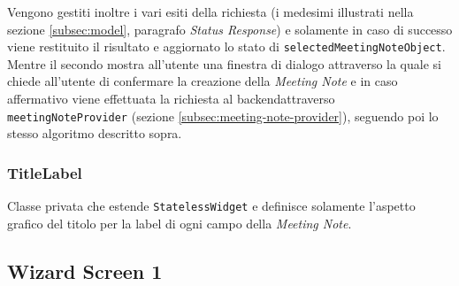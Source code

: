 Vengono gestiti inoltre i vari esiti della richiesta (i medesimi illustrati nella sezione \ref{subsec:model},  paragrafo \emph{Status Response}) e solamente in caso di successo viene restituito il risultato e aggiornato lo stato di \lstinline{selectedMeetingNoteObject}. \\
Mentre il secondo mostra all'utente una finestra di dialogo attraverso la quale si chiede all'utente di confermare la creazione della \emph{Meeting Note} e in caso affermativo viene effettuata la richiesta al \gls{backend}\glsoccur attraverso \lstinline{meetingNoteProvider} (sezione \ref{subsec:meeting-note-provider}), seguendo poi lo stesso algoritmo descritto sopra.

\subsubsection*{TitleLabel}
\label{subsubsec:title-label}

Classe privata che estende \lstinline{StatelessWidget} e definisce solamente l'aspetto grafico del titolo per la label di ogni campo della \emph{Meeting Note}.

\subsection{Wizard Screen 1}
\label{subsec:wizard-screen-1}

